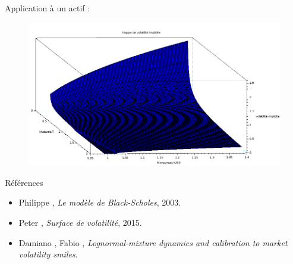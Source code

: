 \documentclass[final]{beamer}
\newlength{\onecolwid}
\begin{document}
\begin{frame}[t]
\begin{columns}[t]
\begin{column}{\onecolwid}
\begin{block}{Application à un actif :}
  \begin{minipage}{1.49\textwidth}
    \begin{figure}
      \vspace{-8.5cm}
      \includegraphics[scale=0.55]{volimpl2.png}
    \end{figure}
  \end{minipage}
\end{block}



\begin{block}{Références}

  \begin{minipage}{0.6\textwidth}
    \begin{itemize}
      \small
        \item Philippe ,  \textit{Le modèle de Black-Scholes}, 2003.
        \item Peter , \textit{Surface de volatilité}, 2015.
        \item Damiano , Fabio , \textit{Lognormal-mixture dynamics and calibration to market volatility smiles}.
    \end{itemize}
    \end{minipage}

    \begin{minipage}{1.49\textwidth}

  \begin{center}


\end{center}
\end{minipage}
\end{block}
\end{column}
\end{columns}
\end{frame}
\end{document}
